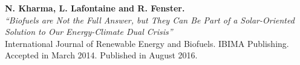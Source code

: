 
\normalsize \textcolor{darktext}{\textbf{N. Kharma, L. Lafontaine and R. Fenster.}}\\
\textit{``Biofuels are Not the Full Answer, but They Can Be Part of a Solar-Oriented Solution to Our Energy-Climate Dual Crisis''}\\
\paragraphstyle \small International Journal of Renewable Energy and Biofuels. IBIMA Publishing. Accepted in March 2014. Published in August 2016.
